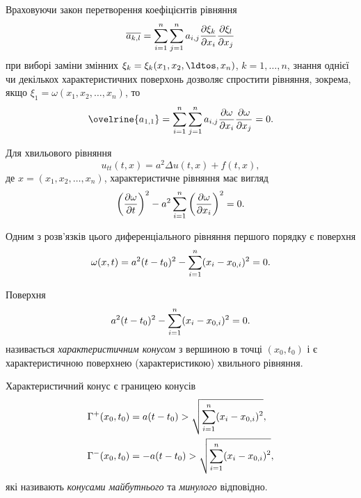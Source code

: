 Враховуючи закон перетворення коефіцієнтів рівняння
\begin{equation}
    \overline{a_{k, l}} = \displaystyle\sum\limits_{i = 1}^n \displaystyle\sum\limits_{j = 1}^n a_{i, j} \frac{\partial \xi_k}{\partial x_i} \frac{\partial \xi_l}{\partial x_j}
\end{equation}
при виборі заміни змінних $\xi_k = \xi_k(x_1, x_2, \ldtos, x_n)$, $k = 1, \ldots, n$, знання однієї чи декількох характеристичних поверхонь дозволяє спростити рівняння, зокрема, якщо $\xi_1 = \omega(x_1, x_2, \ldots, x_n)$, то
\begin{equation}
    \ovelrine{a_{1, 1}} = \Sum_{i = 1}^n \Sum_{j = 1}^n a_{i, j} \frac{\partial \omega}{\partial x_i} \frac{\partial \omega}{\partial x_j} = 0.
\end{equation}

Для хвильового рівняння
\begin{equation}
    u_{tt}(t, x) = a^2 \Delta u(t, x) + f(t, x),
\end{equation}
де $x = (x_1, x_2, \ldots, x_n)$, характеристичне рівняння має вигляд
\begin{equation}
    \left( \frac{\partial \omega}{\partial t} \right)^2 - a^2 \displaystyle\sum\limits_{i = 1}^n \left(\frac{\partial \omega}{\partial x_i} \right)^2 = 0.
\end{equation}

Одним з розв'язків цього диференціального рівняння першого порядку є поверхня
\begin{equation}
    \omega(x, t) = a^2 (t - t_0)^2 - \displaystyle\sum\limits_{i = 1}^n (x_i - x_{0, i})^2 = 0.
\end{equation}

\begin{definition}
    Поверхня
    \begin{equation}
        a^2 (t - t_0)^2 - \displaystyle\sum\limits_{i = 1}^n (x_i - x_{0, i})^2 = 0.
    \end{equation}
    називається \textit{характеристичним конусом} з вершиною в точці $(x_0, t_0)$ і є характеристичною поверхнею (характеристикою) хвильного рівняння.
\end{definition}

\begin{remark}
    Характеристичний конус є границею конусів
    \begin{align}
        \Gamma^+(x_0, t_0) &= a (t - t_0) > \sqrt{ \displaystyle\sum\limits_{i = 1}^n (x_i - x_{0, i})^2 }, \\
        \Gamma^-(x_0, t_0) &= - a (t - t_0) > \sqrt{ \displaystyle\sum\limits_{i = 1}^n (x_i - x_{0, i})^2 },
    \end{align}
    які називають \textit{конусами майбутнього} та \textit{минулого} відповідно.
\end{remark}

